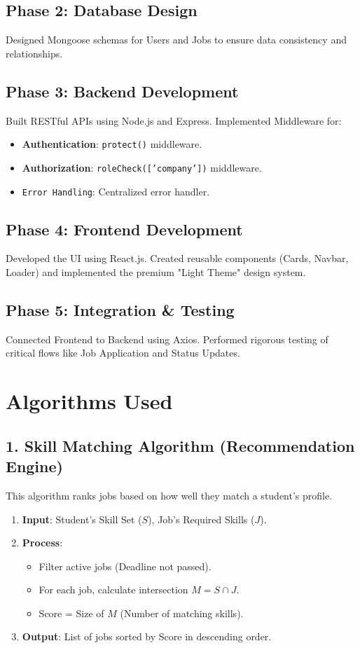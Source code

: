 \documentclass[12pt, a4paper]{report}
\begin{document}
\subsection{Phase 2: Database Design}
Designed Mongoose schemas for Users and Jobs to ensure data consistency and relationships.

\subsection{Phase 3: Backend Development}
Built RESTful APIs using Node.js and Express. Implemented Middleware for:
\begin{itemize}
    \item \textbf{Authentication}: \texttt{protect()} middleware.
    \item \textbf{Authorization}: \texttt{roleCheck(['company'])} middleware.
    \item \texttt{Error Handling}: Centralized error handler.
\end{itemize}

\subsection{Phase 4: Frontend Development}
Developed the UI using React.js. Created reusable components (Cards, Navbar, Loader) and implemented the premium "Light Theme" design system.

\subsection{Phase 5: Integration \& Testing}
Connected Frontend to Backend using Axios. Performed rigorous testing of critical flows like Job Application and Status Updates.

\section{Algorithms Used}

\subsection{1. Skill Matching Algorithm (Recommendation Engine)}
This algorithm ranks jobs based on how well they match a student's profile.
\begin{enumerate}
    \item \textbf{Input}: Student's Skill Set ($S$), Job's Required Skills ($J$).
    \item \textbf{Process}:
    \begin{itemize}
        \item Filter active jobs (Deadline not passed).
        \item For each job, calculate intersection $M = S \cap J$.
        \item Score = Size of $M$ (Number of matching skills).
    \end{itemize}
    \item \textbf{Output}: List of jobs sorted by Score in descending order.
\end{enumerate}
\end{document}
